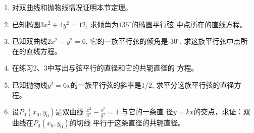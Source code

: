\begin{solution}
    
\end{solution}




















\begin{ex}
\begin{enumerate}
    \item 对双曲线和抛物线情况证明本节定理。
    \item 已知椭圆$3x^2+4y^2=12$, 求倾角为$135^{\circ}$的椭圆平行弦
    中点所在的直线方程。
    \item 已知双曲线$2x^2-y^2=6$, 它的一族平行弦的倾角是
    $30^{\circ}$, 求这族平行弦中点所在的直线方程。
    \item 在练习2、3中写出与弦平行的直径和它的共轭直径的
    方程。
    \item 已知抛物线$y^2=6x$的一族平行弦的斜率是$1/2$, 
    求平分这族平行弦的直径方程。
    \item 设$P_0(x_0,y_0)$是双曲线
    $\frac{x^2}{a^2}-\frac{y^2}{b^2}=1$
    与它的一条直
    径$y=kx$的交点，求证：双曲线在$P_0(x_0,y_0)$的切线
    平行于这条直径的共轭直径。
\end{enumerate}
\end{ex}

